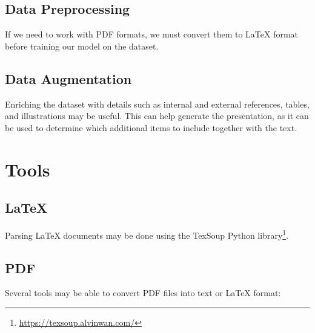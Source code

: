 \subsection{Data Preprocessing}
If we need to work with PDF formats, we must convert them to \LaTeX{} format before training our model on the dataset. 

\subsection{Data Augmentation}
Enriching the dataset with details such as internal and external references, tables, and illustrations may be useful. This can help generate the presentation, as it can be used to determine which additional items to include together with the text.

\section{Tools}

\subsection{\LaTeX{}}
Parsing \LaTeX{} documents may be done using the TexSoup Python library\footnote{\url{https://texsoup.alvinwan.com/}}.

\subsection{PDF}
Several tools may be able to convert PDF files into text or \LaTeX{} format: 

